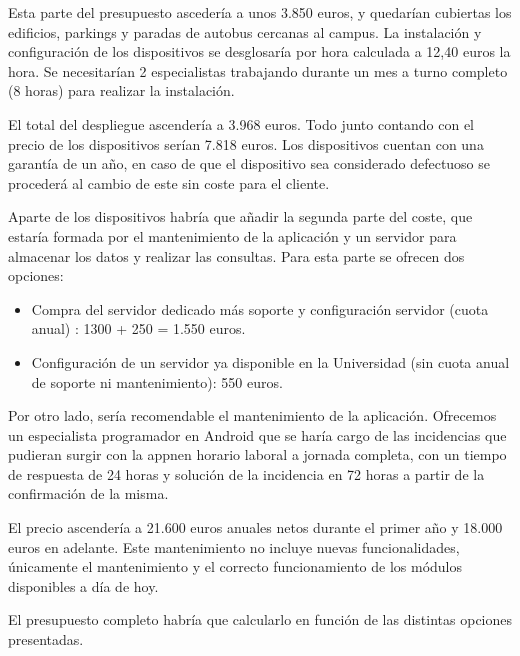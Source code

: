 Esta parte del presupuesto ascedería a unos 3.850 euros, y quedarían cubiertas los edificios, parkings y paradas de autobus cercanas al campus. La instalación y configuración de los dispositivos se desglosaría por hora calculada a 12,40 euros la hora. Se necesitarían 2 especialistas trabajando durante un mes a turno completo (8 horas) para realizar la instalación.

El total del despliegue ascendería a 3.968 euros. Todo junto contando con el precio de los dispositivos serían 7.818 euros. Los dispositivos cuentan con una garantía de un año, en caso de que el dispositivo sea considerado defectuoso se procederá al cambio de este sin coste para el cliente.


Aparte de los dispositivos habría que añadir la segunda parte del coste, que estaría formada por el mantenimiento de la aplicación y un servidor para almacenar los datos y realizar las consultas. Para esta parte se ofrecen dos opciones: 

\begin{itemize}
\item Compra del servidor dedicado más soporte y configuración servidor (cuota anual) : 1300 + 250 = 1.550 euros.
\item Configuración de un servidor ya disponible en la Universidad (sin cuota anual de soporte ni mantenimiento): 550 euros. 
\end{itemize}


Por otro lado, sería recomendable el mantenimiento de la aplicación. Ofrecemos un especialista programador en Android que se haría cargo de las incidencias que pudieran surgir con la appnen horario laboral a jornada completa, con un tiempo de respuesta de 24 horas y solución de la incidencia en 72 horas a partir de la confirmación de la misma.

El precio ascendería a 21.600 euros anuales netos durante el primer año y 18.000 euros en adelante. Este mantenimiento no incluye nuevas funcionalidades, únicamente el mantenimiento y el correcto funcionamiento de los módulos disponibles a día de hoy.

 
El presupuesto completo habría que calcularlo en función de las distintas opciones presentadas. 
